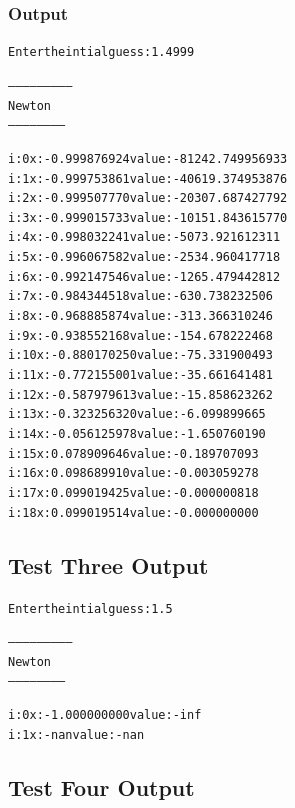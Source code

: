 \documentclass[11pt]{article} %
\begin{document}
\subsubsection*{Output}
\begin{alltt}
Enter the intial guess: 1.4999

--------------------------
 Newton
 -----------------------


i: 0	x: -0.999876924	value: -81242.749956933
i: 1	x: -0.999753861	value: -40619.374953876
i: 2	x: -0.999507770	value: -20307.687427792
i: 3	x: -0.999015733	value: -10151.843615770
i: 4	x: -0.998032241	value: -5073.921612311
i: 5	x: -0.996067582	value: -2534.960417718
i: 6	x: -0.992147546	value: -1265.479442812
i: 7	x: -0.984344518	value: -630.738232506
i: 8	x: -0.968885874	value: -313.366310246
i: 9	x: -0.938552168	value: -154.678222468
i: 10	x: -0.880170250	value: -75.331900493
i: 11	x: -0.772155001	value: -35.661641481
i: 12	x: -0.587979613	value: -15.858623262
i: 13	x: -0.323256320	value: -6.099899665
i: 14	x: -0.056125978	value: -1.650760190
i: 15	x: 0.078909646	value: -0.189707093
i: 16	x: 0.098689910	value: -0.003059278
i: 17	x: 0.099019425	value: -0.000000818
i: 18	x: 0.099019514	value: -0.000000000

\end{alltt}


\subsection*{Test Three Output}
\begin{alltt}

Enter the intial guess: 1.5

--------------------------
 Newton
 -----------------------


i: 0	x: -1.000000000	value: -inf
i: 1	x: -nan	value: -nan

\end{alltt}


\subsection*{Test Four Output}
\begin{alltt}

\end{alltt}
\end{document}
